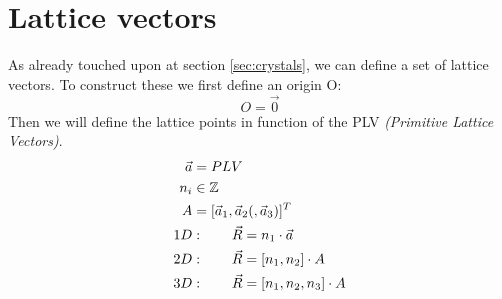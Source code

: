 \section{Lattice vectors} \label{sec:lattice_vectors}
As already touched upon at section \ref{sec:crystals}, we can define a set of lattice vectors. To construct these we first define an origin O:
\begin{equation}
	O = \vec{0}
\end{equation}
Then we will define the lattice points in function of the PLV \textit{(Primitive Lattice Vectors)}.
\begin{align}
	\vec{a} &= PLV \\
	n_i &\in \mathbb{Z} \\
	A &= [\vec{a}_1, \vec{a}_2(, \vec{a}_3)]^T \\
	1D &: \qquad \vec{R} = n_1 \cdot \vec{a} \\
	2D &: \qquad \vec{R} = [n_1, n_2] \cdot A \\
	3D &: \qquad \vec{R} = [n_1, n_2, n_3] \cdot A
\end{align}

